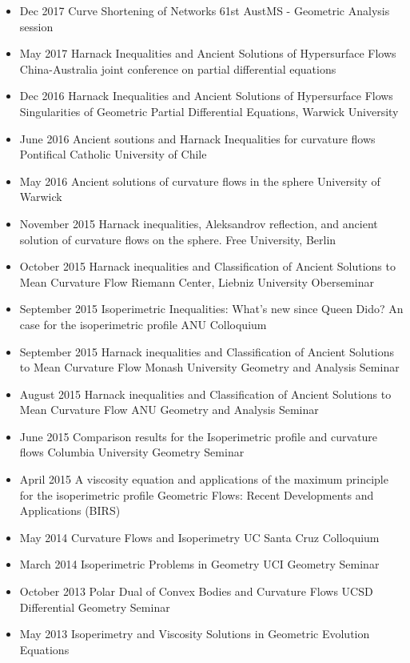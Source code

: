 \documentclass[12pt]{article}
\begin{document}
\begin{itemize}
\item Dec 2017 Curve Shortening of Networks
61st AustMS - Geometric Analysis session
\item May 2017 Harnack Inequalities and Ancient Solutions of Hypersurface Flows
China-Australia joint conference on partial differential equations
\item Dec 2016 Harnack Inequalities and Ancient Solutions of Hypersurface Flows
Singularities of Geometric Partial Differential Equations, Warwick University
\item June 2016 Ancient soutions and Harnack Inequalities for curvature flows
Pontifical Catholic University of Chile
\item May 2016 Ancient solutions of curvature flows in the sphere
University of Warwick
\item November 2015 Harnack inequalities, Aleksandrov reflection, and ancient solution of curvature flows on the sphere.
Free University, Berlin
\item October 2015 Harnack inequalities and Classification of Ancient Solutions to Mean Curvature Flow
Riemann Center, Liebniz University Oberseminar
\item September 2015 Isoperimetric Inequalities: What's new since Queen Dido? An case for the isoperimetric profile
ANU Colloquium
\item September 2015 Harnack inequalities and Classification of Ancient Solutions to Mean Curvature Flow
Monash University Geometry and Analysis Seminar
\item August 2015 Harnack inequalities and Classification of Ancient Solutions to Mean Curvature Flow
ANU Geometry and Analysis Seminar
\item June 2015 Comparison results for the Isoperimetric profile and curvature flows
Columbia University Geometry Seminar
\item April 2015 A viscosity equation and applications of the maximum principle for the isoperimetric profile
Geometric Flows: Recent Developments and Applications (BIRS)
\item May 2014 Curvature Flows and Isoperimetry
UC Santa Cruz Colloquium
\item March 2014 Isoperimetric Problems in Geometry
UCI Geometry Seminar
\item October 2013 Polar Dual of Convex Bodies and Curvature Flows
UCSD Differential Geometry Seminar
\item May 2013 Isoperimetry and Viscosity Solutions in Geometric Evolution Equations

\end{itemize}
\end{document}
